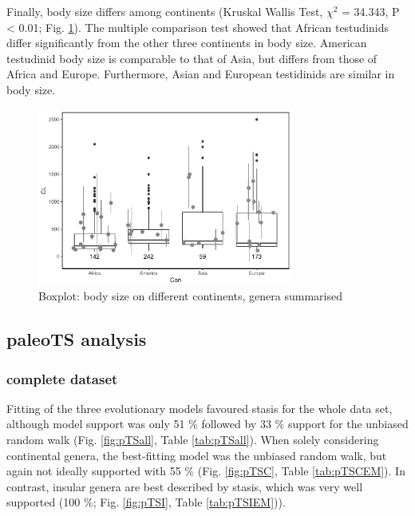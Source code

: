 Finally, body size differs among continents (Kruskal Wallis Test, $\chi^2$ = 34.343, P < 0.01; Fig. \ref{fig:boxCon}). The multiple comparison test showed that African testudinids differ significantly from the other three continents in body size. American testudinid body size is comparable to that of Asia, but differs from those of Africa and Europe. Furthermore, Asian and European testidinids are similar in body size. 


\begin{figure}[htbp]
	\centering
	\includegraphics[width=0.75\textwidth]{MA_JJ_files/figure-latex/BPCon-1.pdf}
	\caption{Boxplot: body size on different continents, genera summarised}
	\label{fig:boxCon}
\end{figure}



\FloatBarrier

\subsection{paleoTS analysis}\label{paleots-analysis}




\subsubsection{complete dataset}\label{all-continental-and-insular}

Fitting of the three evolutionary models favoured stasis for the whole data set, although model support was only 51 \% followed by 33 \% support for the unbiased random walk (Fig. \ref{fig:pTSall}, Table \ref{tab:pTSall}). When solely considering continental genera, the best-fitting model was the unbiased random walk, but again not ideally supported with 55 \% (Fig. \ref{fig:pTSC}, Table \ref{tab:pTSCEM}). In contrast, insular genera are best described by stasis, which was very well supported (100 \%; Fig. \ref{fig:pTSI}, Table \ref{tab:pTSIEM})). 


